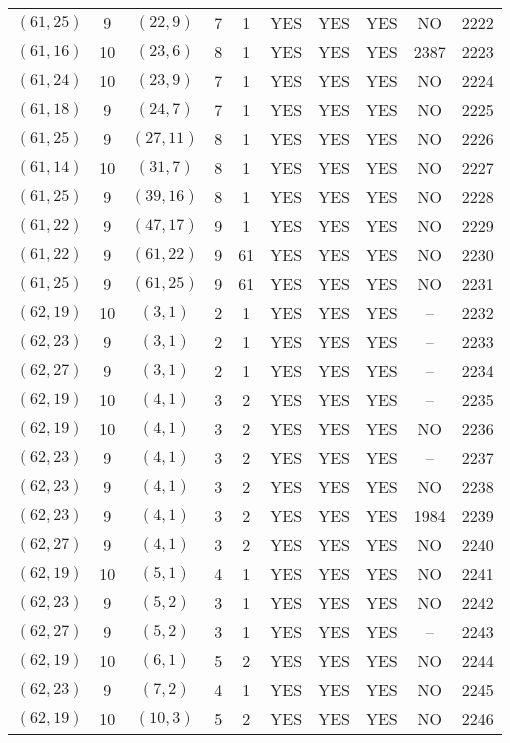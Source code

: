 \begin{longtable}{|c|c|c|c|c|c|c|c|c|c|}
$(61, 25)$ & 9 & $(22, 9)$ & 7 & 1 & YES & YES & YES & NO & 2222\\
$(61, 16)$ & 10 & $(23, 6)$ & 8 & 1 & YES & YES & YES & 2387 & 2223\\
$(61, 24)$ & 10 & $(23, 9)$ & 7 & 1 & YES & YES & YES & NO & 2224\\
$(61, 18)$ & 9 & $(24, 7)$ & 7 & 1 & YES & YES & YES & NO & 2225\\
$(61, 25)$ & 9 & $(27, 11)$ & 8 & 1 & YES & YES & YES & NO & 2226\\
$(61, 14)$ & 10 & $(31, 7)$ & 8 & 1 & YES & YES & YES & NO & 2227\\
$(61, 25)$ & 9 & $(39, 16)$ & 8 & 1 & YES & YES & YES & NO & 2228\\
$(61, 22)$ & 9 & $(47, 17)$ & 9 & 1 & YES & YES & YES & NO & 2229\\
$(61, 22)$ & 9 & $(61, 22)$ & 9 & 61 & YES & YES & YES & NO & 2230\\
$(61, 25)$ & 9 & $(61, 25)$ & 9 & 61 & YES & YES & YES & NO & 2231\\
$(62, 19)$ & 10 & $(3, 1)$ & 2 & 1 & YES & YES & YES & -- & 2232\\
$(62, 23)$ & 9 & $(3, 1)$ & 2 & 1 & YES & YES & YES & -- & 2233\\
$(62, 27)$ & 9 & $(3, 1)$ & 2 & 1 & YES & YES & YES & -- & 2234\\
$(62, 19)$ & 10 & $(4, 1)$ & 3 & 2 & YES & YES & YES & -- & 2235\\
$(62, 19)$ & 10 & $(4, 1)$ & 3 & 2 & YES & YES & YES & NO & 2236\\
$(62, 23)$ & 9 & $(4, 1)$ & 3 & 2 & YES & YES & YES & -- & 2237\\
$(62, 23)$ & 9 & $(4, 1)$ & 3 & 2 & YES & YES & YES & NO & 2238\\
$(62, 23)$ & 9 & $(4, 1)$ & 3 & 2 & YES & YES & YES & 1984 & 2239\\
$(62, 27)$ & 9 & $(4, 1)$ & 3 & 2 & YES & YES & YES & NO & 2240\\
$(62, 19)$ & 10 & $(5, 1)$ & 4 & 1 & YES & YES & YES & NO & 2241\\
$(62, 23)$ & 9 & $(5, 2)$ & 3 & 1 & YES & YES & YES & NO & 2242\\
$(62, 27)$ & 9 & $(5, 2)$ & 3 & 1 & YES & YES & YES & -- & 2243\\
$(62, 19)$ & 10 & $(6, 1)$ & 5 & 2 & YES & YES & YES & NO & 2244\\
$(62, 23)$ & 9 & $(7, 2)$ & 4 & 1 & YES & YES & YES & NO & 2245\\
$(62, 19)$ & 10 & $(10, 3)$ & 5 & 2 & YES & YES & YES & NO & 2246\\

\end{longtable}
